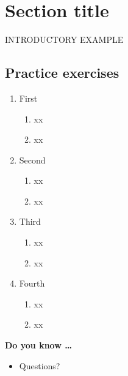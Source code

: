 

\section{Section title}

INTRODUCTORY EXAMPLE


\newpage
\subsection*{Practice exercises}

\begin{enumerate}
\item First

\begin{enumerate}
\item xx
\vfill
\item xx
\vfill
\end{enumerate}

\newpage

\item Second

\begin{enumerate}
\item xx
\vfill
\item xx
\vfill
\end{enumerate}

\newpage

\item Third

\begin{enumerate}
\item xx
\vfill
\item xx
\vfill
\end{enumerate}

\newpage

\newpage

\item Fourth

\begin{enumerate}
\item xx
\vfill
\item xx
\vfill
\end{enumerate}

\end{enumerate}

\noindent \textbf{Do you know \ldots}

\begin{itemize}
\item Questions?
\end{itemize}

